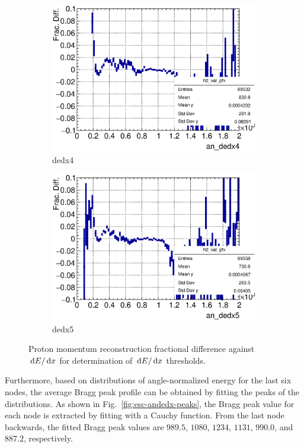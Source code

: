 \begin{figure}[t]
\begin{subfigure}{\dbfigwid\textwidth}
           \includegraphics[width=\textwidth]{figures/sel/ans_dedx4_vs_p_pr_res_hist2d_al2_selpr_con_slice.eps}
           \caption{dedx4}
           \label{subfig:dedx4}
      \end{subfigure}
      \begin{subfigure}{\dbfigwid\textwidth}
           \includegraphics[width=\textwidth]{figures/sel/ans_dedx5_vs_p_pr_res_hist2d_al2_selpr_con_slice.eps}
           \caption{dedx5}
           \label{subfig:dedx5}
      \end{subfigure}
      \caption{Proton momentum reconstruction fractional difference against $\,\textrm{d}E/\,\textrm{d}x$ for determination of $\,\textrm{d}E/\,\textrm{d}x$ thresholds.}
      \label{fig:esc-andedx-slice}
  \end{figure}

     Furthermore, based on distributions of angle-normalized energy for the last six nodes, the average Bragg peak profile can be obtained by fitting the peaks of the distributions.
     As shown in Fig.~\ref{fig:esc-andedx-peaks}, the Bragg peak value for each node is extracted by fitting with a Cauchy function.
     From the last node backwards, the fitted Bragg peak values are $989.5$, $1080$, $1234$, $1131$, $990.0$, and $887.2$, respectively.


